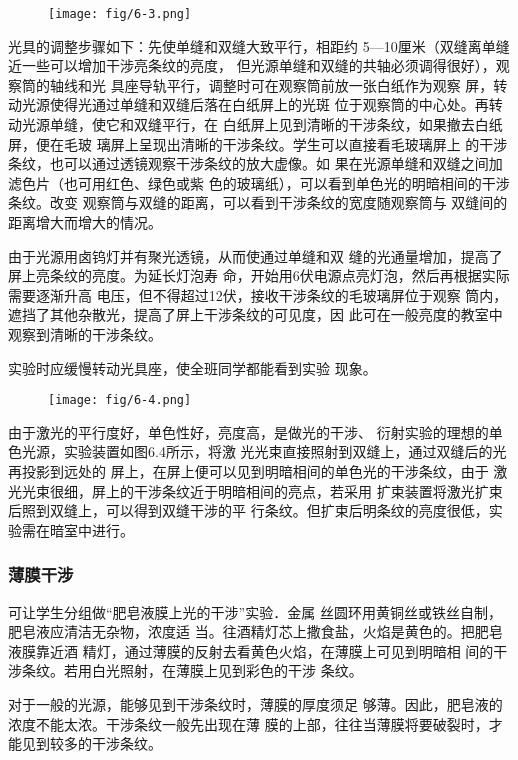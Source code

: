 \begin{figure}[htp]
    \centering
    \texttt{[image: fig/6-3.png]}
    \caption{}
\end{figure}

光具的调整步骤如下：先使单缝和双缝大致平行，相距约
5—10厘米（双缝离单缝近一些可以增加干涉亮条纹的亮度，
但光源单缝和双缝的共轴必须调得很好），观察筒的轴线和光
具座导轨平行，调整时可在观察筒前放一张白纸作为观察
屏，转动光源使得光通过单缝和双缝后落在白纸屏上的光斑
位于观察筒的中心处。再转动光源单缝，使它和双缝平行，在
白纸屏上见到清晰的干涉条纹，如果撤去白纸屏，便在毛玻
璃屏上呈现出清晰的干涉条纹。学生可以直接看毛玻璃屏上
的干涉条纹，也可以通过透镜观察干涉条纹的放大虚像。如
果在光源单缝和双缝之间加滤色片（也可用红色、绿色或紫
色的玻璃纸），可以看到单色光的明暗相间的干涉条纹。改变
观察筒与双缝的距离，可以看到干涉条纹的宽度随观察筒与
双缝间的距离增大而增大的情况。

由于光源用卤钨灯并有聚光透镜，从而使通过单缝和双
缝的光通量增加，提高了屏上亮条纹的亮度。为延长灯泡寿
命，开始用6伏电源点亮灯泡，然后再根据实际需要逐渐升高
电压，但不得超过12伏，接收干涉条纹的毛玻璃屏位于观察
筒内，遮挡了其他杂散光，提高了屏上干涉条纹的可见度，因
此可在一般亮度的教室中观察到清晰的干涉条纹。

实验时应缓慢转动光具座，使全班同学都能看到实验
现象。

\begin{figure}[htp]
    \centering
    \texttt{[image: fig/6-4.png]}
    \caption{}
\end{figure}

由于激光的平行度好，单色性好，亮度高，是做光的干涉、
衍射实验的理想的单色光源，实验装置如图6.4所示，将激
光光束直接照射到双缝上，通过双缝后的光再投影到远处的
屏上，在屏上便可以见到明暗相间的单色光的干涉条纹，由于
激光光束很细，屏上的干涉条纹近于明暗相间的亮点，若采用
扩束装置将激光扩束后照到双缝上，可以得到双缝干涉的平
行条纹。但扩束后明条纹的亮度很低，实验需在暗室中进行。

\subsubsection{薄膜干涉}

可让学生分组做“肥皂液膜上光的干涉”实验．金属
丝圆环用黄铜丝或铁丝自制，肥皂液应清洁无杂物，浓度适
当。往酒精灯芯上撒食盐，火焰是黄色的。把肥皂液膜靠近酒
精灯，通过薄膜的反射去看黄色火焰，在薄膜上可见到明暗相
间的干涉条纹。若用白光照射，在薄膜上见到彩色的干涉
条纹。

对于一般的光源，能够见到干涉条纹时，薄膜的厚度须足
够薄。因此，肥皂液的浓度不能太浓。干涉条纹一般先出现在薄
膜的上部，往往当薄膜将要破裂时，才能见到较多的干涉条纹。

